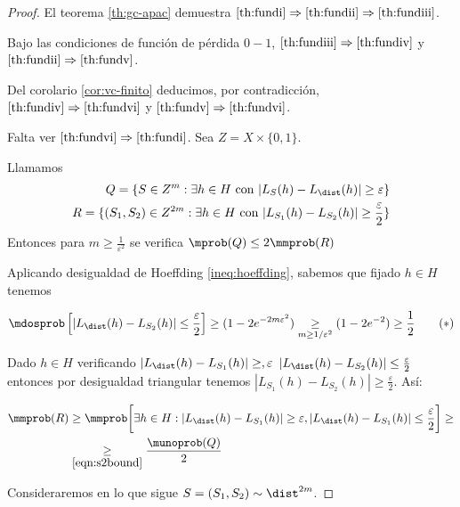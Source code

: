 \begin{proof}
 El teorema \ref{th:gc-apac} demuestra $\eqref{th:fundi} \Rightarrow \eqref{th:fundii} \Rightarrow \eqref{th:fundiii}$.
 
 Bajo las condiciones de función de pérdida $0-1$, $\eqref{th:fundiii} \Rightarrow \eqref{th:fundiv}$ y 
 $\eqref{th:fundii} \Rightarrow \eqref{th:fundv}$. 
 
 Del corolario \ref{cor:vc-finito} deducimos, por contradicción, $\eqref{th:fundiv} \Rightarrow \eqref{th:fundvi}$
 y $\eqref{th:fundv} \Rightarrow \eqref{th:fundvi}$.
 
 Falta ver $\eqref{th:fundvi} \Rightarrow \eqref{th:fundi}$. Sea $Z = X \times \{0,1\}$.
 
 Llamamos \begin{align*} 
	   Q = \{S \in Z^m : \exists h\in H \textrm{ con } |L_S(h) - L_{\dist}(h)| \ge \varepsilon\}\\
           R = \{(S_1, S_2) \in Z^{2m}: \exists h\in H \textrm{ con } |L_{S_1}(h) - L_{S_2}(h)| \ge \frac{\varepsilon}{2}\}\\
          \end{align*}
 Entonces para $m\ge \frac{1}{\varepsilon^2}$ se verifica $\mprob(Q) \le 2 \mmprob(R)$
 

 Aplicando desigualdad de Hoeffding \ref{ineq:hoeffding}, sabemos que fijado $h\in H$ tenemos 

 \begin{equation}
  \mdosprob \left[|L_{\dist}(h) - L_{S_2}(h)| \le \frac{\varepsilon}{2} \right] \ge 
   (1 - 2e^{-2m\varepsilon^2}) \underset{m\ge 1/\varepsilon^2}{\ge} (1 - 2e^{-2}) \ge \frac{1}{2}
  \tag{\mbox{$\ast$}}\label{eqn:s2bound}
 \end{equation}

 Dado $h\in H$ verificando $|L_{\dist}(h) - L_{S_1}(h)| \ge, \varepsilon$ $|L_{\dist}(h) - L_{S_2}(h)| \le \frac{\varepsilon}{2}$
 entonces por desigualdad triangular tenemos $|L_{S_1}(h) - L_{S_2}(h)| \ge \frac{\varepsilon}{2}$. Así:
 
 \begin{align}
  \mmprob(R) &\ge \mmprob \bigg[ \exists h \in H: |L_{\dist}(h) - L_{S_1}(h)| 
		 \ge \varepsilon, |L_{\dist}(h) - L_{S_1}(h)| \le \frac{\varepsilon}{2} \bigg] \ge \nonumber\\
             &\underset{\eqref{eqn:s2bound}}{\ge} \frac{\munoprob(Q)}{2} \label{eqn:Qbound}
 \end{align} 

 
 Consideraremos en lo que sigue $S = (S_1, S_2) \sim \dist^{2m}$.
 

\end{proof}
